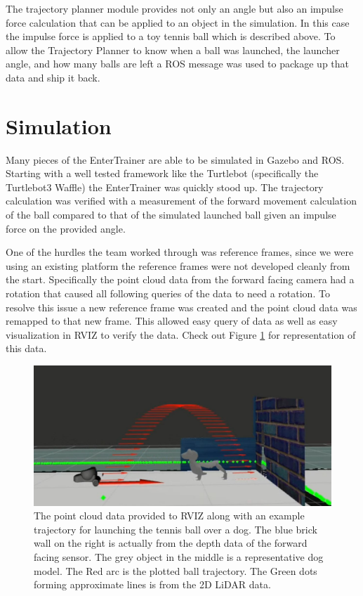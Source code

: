 \documentclass[11pt]{article}
\begin{document}
The trajectory planner module provides not only an angle but also an impulse force calculation that can be applied to an object in the simulation.  In this case the impulse force is applied to a toy tennis ball which is described above.  To allow the Trajectory Planner to know when a ball was launched, the launcher angle, and how many balls are left a ROS message was used to package up that data and ship it back.  


\section{Simulation}
Many pieces of the EnterTrainer are able to be simulated in Gazebo and ROS.  Starting with a well tested framework like the Turtlebot (specifically the Turtlebot3 Waffle) the EnterTrainer was quickly stood up.  The trajectory calculation was verified with a measurement of the forward movement calculation of the ball compared to that of the simulated launched ball given an impulse force on the provided angle.  

One of the hurdles the team worked through was reference frames, since we were using an existing platform the reference frames were not developed cleanly from the start.  Specifically the point cloud data from the forward facing camera had a rotation that caused all following queries of the data to need a rotation.  To resolve this issue a new reference frame was created and the point cloud data was remapped to that new frame. This allowed easy query of data as well as easy visualization in RVIZ to verify the data.  Check out Figure \ref{Point Cloud Data and Trajectory in RVIZ} for representation of this data.  

\begin{figure}[H]
    \centering
        \includegraphics[scale=.4, angle =0]{figures/arc.JPG}
    \caption{The point cloud data provided to RVIZ along with an example trajectory for launching the tennis ball over a dog.  The blue brick wall on the right is actually from the depth data of the forward facing sensor.  The grey object in the middle is a representative dog model.  The Red arc is the plotted ball trajectory.  The Green dots forming approximate lines is from the 2D LiDAR data. }
    \label{Point Cloud Data and Trajectory in RVIZ}
\end{figure}
\end{document}
